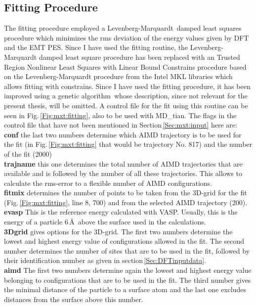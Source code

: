 \documentclass[twoside, 11pt, titlepage, captions=nooneline, a4paper, headsepline]{scrbook}%
\begin{document}
\subsection{Fitting Procedure}
The fitting procedure employed a Levenberg-Marquardt\,\cite{Levenberg1944,Marquardt1963} damped least squares procedure which minimizes the rms deviation of the energy values given by DFT and the EMT PES. Since I have used the fitting routine, the Levenberg-Marquardt damped least square procedure has been replaced with an Trusted Region Nonlinear Least Squares with Linear Bound Constrains procedure based on the Levenberg-Marquardt procedure from the Intel MKL libraries which allows fitting with constrains. Since I have used the fitting procedure, it has been improved using a genetic algorithm\,\cite{marvinmaster,marvinpc} whose description, since not relevant for the present thesis, will be omitted. A control file for the fit using this routine can be seen in Fig.\,\ref{Fig:mxt:fitting}, also to be used with MD\_tian. The flags in the control file that have not been mentioned in Section\,\ref{Sec:mxt:input} here are:\\
\textbf{conf} the last two numbers determine which AIMD trajectory is to be used for the fit (in Fig.\,\ref{Fig:mxt:fitting} that would be trajectory No. 817) and the number of the fit (2000)\\
\textbf{trajname} this one determines the total number of AIMD trajectories that are available and is followed by the number of all these trajectories. This allows to calculate the rms-error to a flexible number of AIMD configurations.\\
\textbf{fitmix} determines the number of points to be taken from the 3D-grid for the fit (Fig.\,\ref{Fig:mxt:fitting}, line 8, 700) and from the selected AIMD trajectory (200).\\
\textbf{evasp} This is the reference energy calculated with VASP. Usually, this is the energy of a particle 6\,\AA~above the surface used in the calculations.\\
\textbf{3Dgrid} gives options for the 3D-grid. The first two numbers determine the lowest and highest energy value of configurations allowed in the fit. The second number determines the number of sites that are to be used in the fit, followed by their identification number as given in section\,\ref{Sec:DFTinputdata}.\\
\textbf{aimd} The first two numbers determine again the lowest and highest energy value belonging to configurations that are to be used in the fit. The third number gives the minimal distance of the particle to a surface atom and the last one excludes distances from the surface above this number.\\
\end{document}
